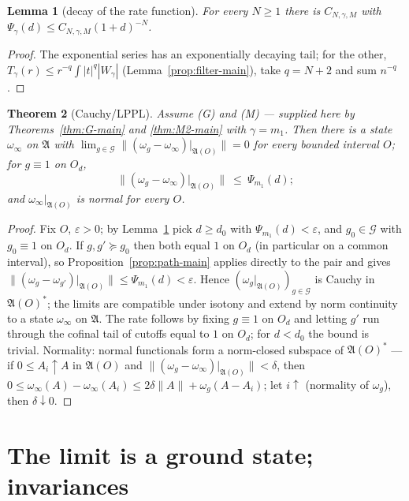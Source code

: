 \documentclass[11pt,a4paper]{article}
\theoremstyle{plain}
\newtheorem{theorem}{Theorem}[section]
\newtheorem{lemma}[theorem]{Lemma}
\theoremstyle{definition}
\newcommand{\A}{\mathfrak{A}}
\newcommand{\G}{\mathcal{G}}
\begin{document}
\begin{lemma}[decay of the rate function]\label{lem:Psitail-main}
For every $N\ge1$ there is $C_{N,\gamma,M}$ with $\Psi_\gamma(d)\le C_{N,\gamma,M}(1+d)^{-N}$.
\end{lemma}

\begin{proof}
The exponential series has an exponentially decaying tail; for the other,
$T_\gamma(r)\le r^{-q}\int|t|^q|W_\gamma|$ (Lemma~\ref{prop:filter-main}), take $q=N+2$ and sum
$n^{-q}$.
\end{proof}

\begin{theorem}[Cauchy/LPPL]\label{thm:lppl-main}
Assume \textup{(G)} and \textup{(M)} --- supplied here by Theorems~\ref{thm:G-main} and
\ref{thm:M2-main} with $\gamma=m_1$. Then there is a state $\omega_\infty$ on $\A$ with
$\lim_{g\in\G}\|(\omega_g-\omega_\infty)|_{\A(O)}\|=0$ for every bounded interval $O$;
for $g\equiv1$ on $O_d$,
\[
  \|(\omega_g-\omega_\infty)|_{\A(O)}\|\ \le\ \Psi_{m_1}(d);
\]
and $\omega_\infty|_{\A(O)}$ is normal for every $O$.
\end{theorem}

\begin{proof}
Fix $O$, $\varepsilon>0$; by Lemma~\ref{lem:Psitail-main} pick $d\ge d_0$ with
$\Psi_{m_1}(d)<\varepsilon$, and $g_0\in\G$ with $g_0\equiv1$ on $O_d$. If
$g,g'\succcurlyeq g_0$ then both equal $1$ on $O_d$ (in particular on a common interval), so
Proposition~\ref{prop:path-main} applies directly to the pair and gives
$\|(\omega_g-\omega_{g'})|_{\A(O)}\|\le\Psi_{m_1}(d)<\varepsilon$. Hence
$(\omega_g|_{\A(O)})_{g\in\G}$ is Cauchy in $\A(O)^*$; the limits are compatible under isotony
and extend by norm continuity to a state $\omega_\infty$ on $\A$. The rate follows by fixing
$g\equiv1$ on $O_d$ and letting $g'$ run through the cofinal tail of cutoffs equal to $1$ on
$O_d$; for $d<d_0$ the bound is trivial. Normality: normal functionals form a norm-closed
subspace of $\A(O)^*$ --- if $0\le A_i\uparrow A$ in $\A(O)$ and
$\|(\omega_g-\omega_\infty)|_{\A(O)}\|<\delta$, then
$0\le\omega_\infty(A)-\omega_\infty(A_i)\le2\delta\|A\|+\omega_g(A-A_i)$; let $i\uparrow$ (normality
of $\omega_g$), then $\delta\downarrow0$.
\end{proof}

\section{The limit is a ground state; invariances}\label{sec:ground}
\end{document}
